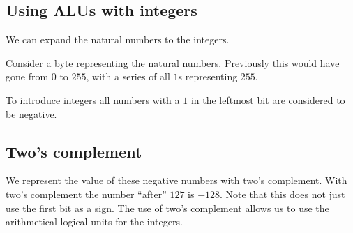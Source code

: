 
\subsection{Using ALUs with integers}

We can expand the natural numbers to the integers.

Consider a byte representing the natural numbers. Previously this would have gone from \(0\) to \(255\), with a series of all \(1\)s representing \(255\).

To introduce integers all numbers with a \(1\) in the leftmost bit are considered to be negative.

\subsection{Two's complement}

We represent the value of these negative numbers with two’s complement. With two’s complement the number “after” \(127\) is \(-128\). Note that this does not just use the first bit as a sign. The use of two’s complement allows us to use the arithmetical logical units for the integers.

